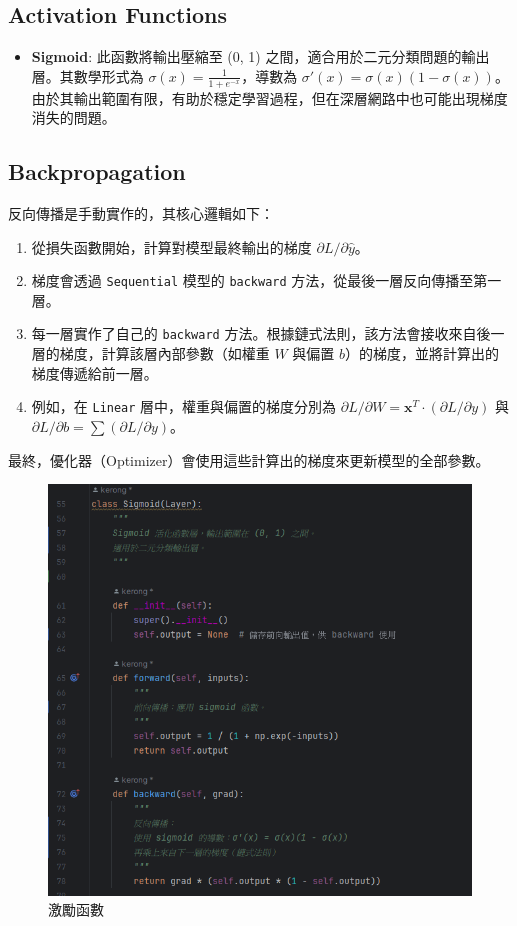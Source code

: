 \documentclass{article}
\begin{document}
\subsection{Activation Functions}

\begin{itemize}
  \item \textbf{Sigmoid}: 此函數將輸出壓縮至 (0, 1) 之間，適合用於二元分類問題的輸出層。其數學形式為 \(\sigma(x) = \frac{1}{1 + e^{-x}}\)，導數為 \(\sigma'(x) = \sigma(x)(1 - \sigma(x))\)。由於其輸出範圍有限，有助於穩定學習過程，但在深層網路中也可能出現梯度消失的問題。
\end{itemize}

\subsection{Backpropagation}
反向傳播是手動實作的，其核心邏輯如下：
\begin{enumerate}
  \item 從損失函數開始，計算對模型最終輸出的梯度 \(\partial L / \partial \hat{y}\)。
  \item 梯度會透過 \texttt{Sequential} 模型的 \texttt{backward} 方法，從最後一層反向傳播至第一層。
  \item 每一層實作了自己的 \texttt{backward} 方法。根據鏈式法則，該方法會接收來自後一層的梯度，計算該層內部參數（如權重 \(W\) 與偏置 \(b\)）的梯度，並將計算出的梯度傳遞給前一層。
  \item 例如，在 \texttt{Linear} 層中，權重與偏置的梯度分別為 \(\partial L / \partial W = \mathbf{x}^T \cdot (\partial L / \partial y)\) 與 \(\partial L / \partial b = \sum (\partial L / \partial y)\)。
\end{enumerate}
最終，優化器（Optimizer）會使用這些計算出的梯度來更新模型的全部參數。

\begin{figure}[htp]
    \centering
    \includegraphics[width=12cm]{Lab01_report/img/2.2.png}
    \caption{激勵函數}
    \label{fig:activation}
\end{figure}
\end{document}
